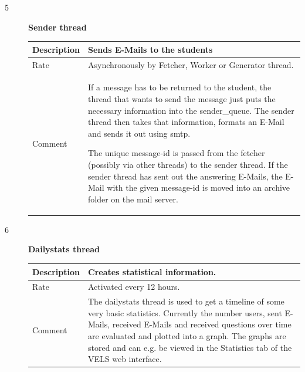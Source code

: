 \begin{description}
	\item [5] \textbf{Sender thread} \\
    \begin{tabular}{|p{2cm}|p{11cm}|}
        \hline
        Description & Sends E-Mails to the students \\
        \hline
        Rate & Asynchronously by Fetcher, Worker or Generator thread. \\
		\hline
		Comment & If a message has to be returned to the student, the thread that 
		wants to send the message just puts the necessary information into the 
		sender\_queue. The sender thread then takes that information, formats an 
		E-Mail and sends it out using \gls{smtp}.

        The unique message-id is passed from the fetcher (possibly via other 
		threads) to the sender thread. If the sender thread has sent out the 
		answering E-Mails, the E-Mail with the given message-id is moved into an 
		archive folder on the mail server.
        \\
        \hline
    \end{tabular}

	\newpage 

	\item [6] \textbf{Dailystats thread} \\
    \begin{tabular}{|p{2cm}|p{11cm}|}
        \hline
        Description & Creates statistical information. \\
        \hline
        Rate & Activated every 12 hours. \\
		\hline
		Comment & The dailystats thread is used to get a timeline of some very basic statistics.
		Currently the number users, sent E-Mails, received E-Mails and received questions
		over time are evaluated and plotted into a graph. The graphs are stored and 
		can e.g. be viewed in the Statistics tab of the VELS web interface.
        \\
        \hline

    \end{tabular}
\end{description}

